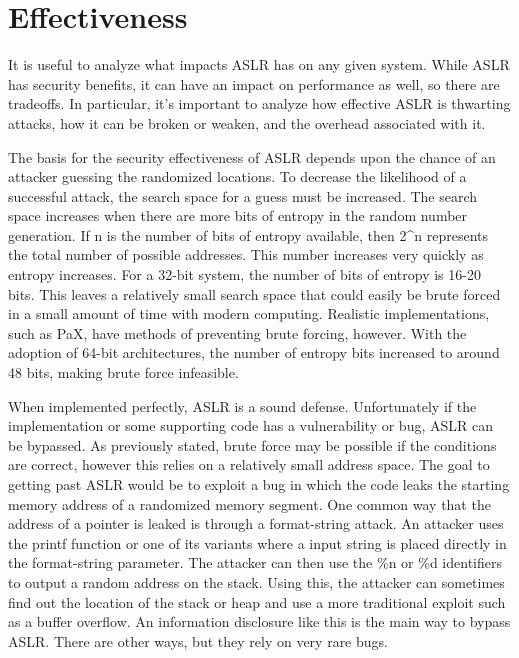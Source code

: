 \section{Effectiveness}
\label{s:effectiveness} %

It is useful to analyze what impacts ASLR has on any given system. While ASLR has security benefits, it can have an impact on performance as well, so there are tradeoffs. In particular, it’s important to analyze how effective ASLR is thwarting attacks, how it can be broken or weaken, and the overhead associated with it.

The basis for the security effectiveness of ASLR depends upon the chance of an attacker guessing the randomized locations. To decrease the likelihood of a successful attack, the search space for a guess must be increased. The search space increases when there are more bits of entropy in the random number generation. If n is the number of bits of entropy available, then 2^n represents the total number of possible addresses. This number increases very quickly as entropy increases. For a 32-bit system, the number of bits of entropy is 16-20 bits. This leaves a relatively small search space that could easily be brute forced in a small amount of time with modern computing. Realistic implementations, such as PaX, have methods of preventing brute forcing, however. With the adoption of 64-bit architectures, the number of entropy bits increased to around 48 bits, making brute force infeasible.

When implemented perfectly, ASLR is a sound defense. Unfortunately if the implementation or some supporting code has a vulnerability or bug, ASLR can be bypassed. As previously stated, brute force may be possible if the conditions are correct, however this relies on a relatively small address space. The goal to getting past ASLR would be to exploit a bug in which the code leaks the starting memory address of a randomized memory segment. One common way that the address of a pointer is leaked is through a format-string attack. \cite{bhatkar2003address} An attacker uses the printf function or one of its variants where a input string is placed directly in the format-string parameter. The attacker can then use the \%n or \%d identifiers to output a random address on the stack. Using this, the attacker can sometimes find out the location of the stack or heap and use a more traditional exploit such as a buffer overflow. An information disclosure like this is the main way to bypass ASLR. There are other ways, but they rely on very rare bugs.

